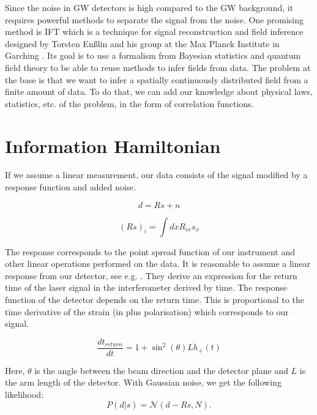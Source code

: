 Since the noise in GW detectors is high compared to the GW background, it requires powerful methods to separate the signal from the noise. One promising method is IFT which is a technique for signal reconstruction and field inference designed by Torsten Enßlin and his group at the Max Planck Institute in Garching \cite{enslin_information_2013}. Its goal is to use a formalism from Bayesian statistics and quantum field theory to be able to reuse methods to infer fields from data. The problem at the base is that we want to infer a spatially continuously distributed field from a finite amount of data. To do that, we can add our knowledge about physical laws, statistics, etc. of the problem, in the form of correlation functions.


\section{Information Hamiltonian}

If we assume a linear measurement, our data consists of the signal modified by a response function and added noise. 

\begin{equation}
    d = R s + n
\end{equation}

\begin{equation}
    (R s)_i = \int dx R_{ix} s_{x}
\end{equation}

The response corresponds to the point spread function of our instrument and
other linear operations performed on the data. It is reasonable to assume a linear response from our detector, see e.g. \cite{sathyaprakash_physics_2009}. They derive an expression for the return time of the laser signal in the interferometer derived by time. The response function of the detector depends on the return time. This is proportional to the time derivative of the strain (in plus polarisation) which corresponds to our signal.

\begin{equation}
    \frac{dt_{return}}{dt}=1+\sin^2(\theta)L \dot{h}_+(t)
\end{equation}

Here, $\theta$ is the angle between the beam direction and the detector plane and $L$ is the arm length of the detector. With Gaussian noise, we get the following likelihood:
\begin{equation}
    P(d|s) = \mathcal{N}(d-Rs, N) .
\end{equation}

